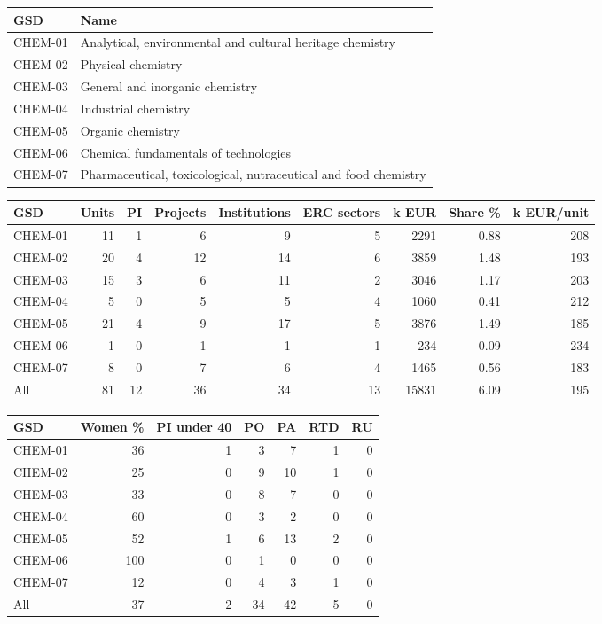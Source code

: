 \documentclass[11pt,a4paper]{article}
\begin{document}
\begin{table}[H]
\centering
\footnotesize
\begin{tabular}{ll}
\toprule
GSD & Name \\
\midrule
CHEM-01 & Analytical, environmental and cultural heritage chemistry \\
CHEM-02 & Physical chemistry \\
CHEM-03 & General and inorganic chemistry \\
CHEM-04 & Industrial chemistry \\
CHEM-05 & Organic chemistry \\
CHEM-06 & Chemical fundamentals of technologies \\
CHEM-07 & Pharmaceutical, toxicological, nutraceutical and food chemistry \\
\bottomrule
\end{tabular}
\end{table}
\begin{table}[H]
\centering
\footnotesize
\begin{tabular}{lrrrrrrrr}
\toprule
GSD & Units & PI & Projects & Institutions & ERC sectors & k EUR & Share \% & k EUR/unit \\
\midrule
CHEM-01 & 11 & 1 & 6 & 9 & 5 & 2291 & 0.88 & 208 \\
CHEM-02 & 20 & 4 & 12 & 14 & 6 & 3859 & 1.48 & 193 \\
CHEM-03 & 15 & 3 & 6 & 11 & 2 & 3046 & 1.17 & 203 \\
CHEM-04 & 5 & 0 & 5 & 5 & 4 & 1060 & 0.41 & 212 \\
CHEM-05 & 21 & 4 & 9 & 17 & 5 & 3876 & 1.49 & 185 \\
CHEM-06 & 1 & 0 & 1 & 1 & 1 & 234 & 0.09 & 234 \\
CHEM-07 & 8 & 0 & 7 & 6 & 4 & 1465 & 0.56 & 183 \\
All & 81 & 12 & 36 & 34 & 13 & 15831 & 6.09 & 195 \\
\bottomrule
\end{tabular}
\end{table}
\begin{table}[H]
\centering
\footnotesize
\begin{tabular}{lrrrrrr}
\toprule
GSD & Women \% & PI under 40 & PO & PA & RTD & RU \\
\midrule
CHEM-01 & 36 & 1 & 3 & 7 & 1 & 0 \\
CHEM-02 & 25 & 0 & 9 & 10 & 1 & 0 \\
CHEM-03 & 33 & 0 & 8 & 7 & 0 & 0 \\
CHEM-04 & 60 & 0 & 3 & 2 & 0 & 0 \\
CHEM-05 & 52 & 1 & 6 & 13 & 2 & 0 \\
CHEM-06 & 100 & 0 & 1 & 0 & 0 & 0 \\
CHEM-07 & 12 & 0 & 4 & 3 & 1 & 0 \\
All & 37 & 2 & 34 & 42 & 5 & 0 \\
\bottomrule
\end{tabular}
\end{table}
\end{document}
